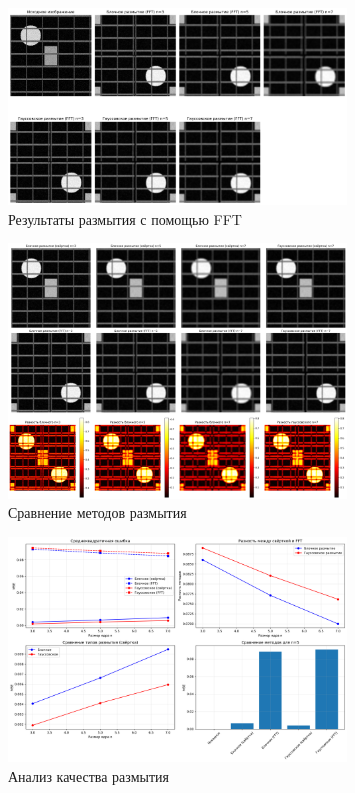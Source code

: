 \begin{figure}[H]
    \centering
    \includegraphics[width=0.8\textwidth]{images/task2/fft_results.png}
    \caption{Результаты размытия с помощью FFT}
    \label{fig:fft_blur}
\end{figure}

\begin{figure}[H]
    \centering
    \includegraphics[width=0.8\textwidth]{images/task2/method_comparison.png}
    \caption{Сравнение методов размытия}
    \label{fig:method_comparison_blur}
\end{figure}

\begin{figure}[H]
    \centering
    \includegraphics[width=0.8\textwidth]{images/task2/quality_analysis.png}
    \caption{Анализ качества размытия}
    \label{fig:quality_analysis_blur}
\end{figure}

